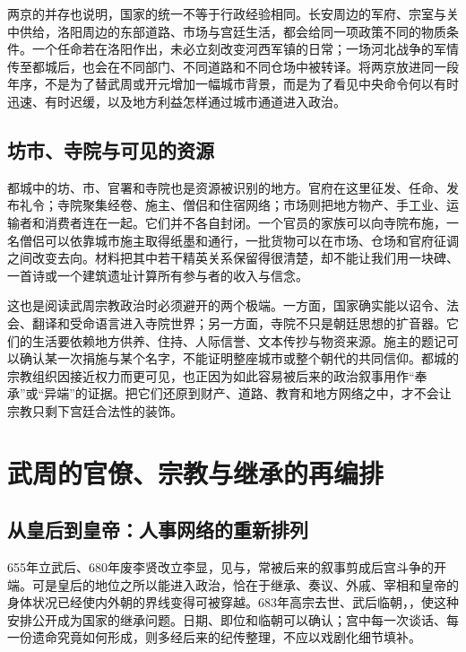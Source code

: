 两京的并存也说明，国家的统一不等于行政经验相同。长安周边的军府、宗室与关中供给，洛阳周边的东部道路、市场与宫廷生活，都会给同一项政策不同的物质条件。一个任命若在洛阳作出，未必立刻改变河西军镇的日常；一场河北战争的军情传至都城后，也会在不同部门、不同道路和不同仓场中被转译。将两京放进同一段年序，不是为了替武周或开元增加一幅城市背景，而是为了看见中央命令何以有时迅速、有时迟缓，以及地方利益怎样通过城市通道进入政治。

\subsection{坊市、寺院与可见的资源}
都城中的坊、市、官署和寺院也是资源被识别的地方。官府在这里征发、任命、发布礼令；寺院聚集经卷、施主、僧侣和住宿网络；市场则把地方物产、手工业、运输者和消费者连在一起。它们并不各自封闭。一个官员的家族可以向寺院布施，一名僧侣可以依靠城市施主取得纸墨和通行，一批货物可以在市场、仓场和官府征调之间改变去向。材料把其中若干精英关系保留得很清楚，却不能让我们用一块碑、一首诗或一个建筑遗址计算所有参与者的收入与信念。

这也是阅读武周宗教政治时必须避开的两个极端。一方面，国家确实能以诏令、法会、翻译和受命语言进入寺院世界；另一方面，寺院不只是朝廷思想的扩音器。它们的生活要依赖地方供养、住持、人际信誉、文本传抄与物资来源。施主的题记可以确认某一次捐施与某个名字，不能证明整座城市或整个朝代的共同信仰。都城的宗教组织因接近权力而更可见，也正因为如此容易被后来的政治叙事用作“奉承”或“异端”的证据。把它们还原到财产、道路、教育和地方网络之中，才不会让宗教只剩下宫廷合法性的装饰。

\section{武周的官僚、宗教与继承的再编排}
\label{sec:wu-zhou-bureaucracy-religion}
\subsection{从皇后到皇帝：人事网络的重新排列}
655年立武后、680年废李贤改立李显，见与，常被后来的叙事剪成后宫斗争的开端。可是皇后的地位之所以能进入政治，恰在于继承、奏议、外戚、宰相和皇帝的身体状况已经使内外朝的界线变得可被穿越。683年高宗去世、武后临朝，，使这种安排公开成为国家的继承问题。日期、即位和临朝可以确认；宫中每一次谈话、每一份遗命究竟如何形成，则多经后来的纪传整理，不应以戏剧化细节填补。

